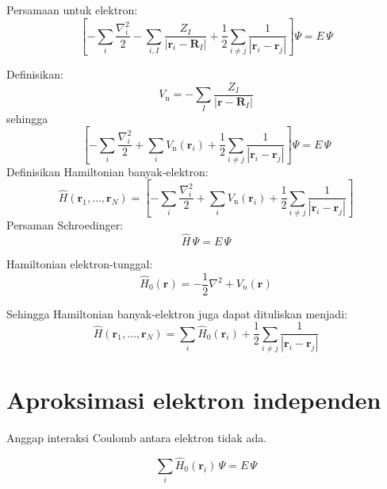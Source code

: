 \documentclass[a4paper,12pt]{article} %
\begin{document}
Persamaan untuk elektron:
\begin{equation}
\left[
-\sum_{i}\frac{\nabla^{2}_{i}}{2}
-\sum_{i,I} \frac{Z_{I}}{\left| \mathbf{r}_{i} - \mathbf{R}_{I} \right|}
+\frac{1}{2}\sum_{i \neq j} \frac{1}{\left| \mathbf{r}_{i} - \mathbf{r}_{j} \right|}
\right] \Psi = E \, \Psi
\end{equation}

Definisikan:
\begin{equation}
V_{\mathrm{n}} = -\sum_{I} \frac{Z_{I}}{\left| \mathbf{r} - \mathbf{R}_{I} \right|}
\end{equation}
sehingga
\begin{equation}
\left[
-\sum_{i}\frac{\nabla^{2}_{i}}{2}
+\sum_{i} V_{\mathrm{n}}(\mathbf{r}_{i})
+\frac{1}{2}\sum_{i \neq j} \frac{1}{\left| \mathbf{r}_{i} - \mathbf{r}_{j} \right|}
\right] \Psi = E \, \Psi
\end{equation}
Definisikan Hamiltonian banyak-elektron:
\begin{equation}
\hat{H}(\mathbf{r}_{1},\ldots,\mathbf{r}_{N}) =
\left[
-\sum_{i}\frac{\nabla^{2}_{i}}{2}
+\sum_{i} V_{\mathrm{n}}(\mathbf{r}_{i})
+\frac{1}{2}\sum_{i \neq j} \frac{1}{\left| \mathbf{r}_{i} - \mathbf{r}_{j} \right|}
\right]
\end{equation}
Persaman Schroedinger:
\begin{equation}
\hat{H} \, \Psi = E \, \Psi
\end{equation}

Hamiltonian elektron-tunggal:
\begin{equation}
\hat{H}_{0}(\mathbf{r}) = -\frac{1}{2}\nabla^2 + V_{n}(\mathbf{r})
\end{equation}

Sehingga Hamiltonian banyak-elektron juga dapat dituliskan menjadi:
\begin{equation}
\hat{H}(\mathbf{r}_{1},\ldots,\mathbf{r}_{N}) =
\sum_{i} \hat{H}_{0}(\mathbf{r}_{i}) +
\frac{1}{2}\sum_{i \neq j}\frac{1}{\left| \mathbf{r}_{i} - \mathbf{r}_{j} \right|}
\end{equation}


\section{Aproksimasi elektron independen}

Anggap interaksi Coulomb antara elektron tidak ada.

\begin{equation}
\sum_{i} \hat{H}_{0}(\mathbf{r}_{i})\, \Psi = E \, \Psi
\end{equation}
\end{document}
